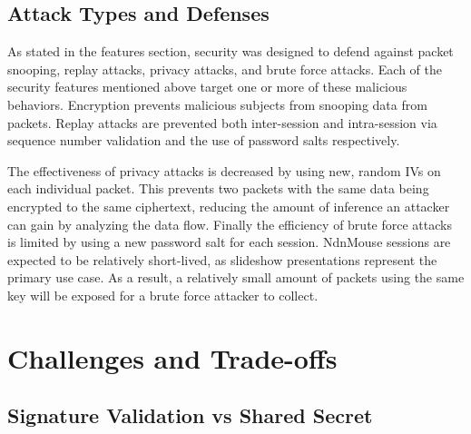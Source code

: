 \documentclass{sig-alternate}
\renewcommand\_{\textunderscore\allowbreak}  %
\begin{document}
\subsection{Attack Types and Defenses}
As stated in the features section, security was designed to defend against packet snooping, replay attacks, privacy attacks, and brute force attacks. Each of the security features mentioned above target one or more of these malicious behaviors. Encryption prevents malicious subjects from snooping data from packets. Replay attacks are prevented both inter-session and intra-session via sequence number validation and the use of password salts respectively. 

The effectiveness of privacy attacks is decreased by using new, random IVs on each individual packet. This prevents two packets with the same data being encrypted to the same ciphertext, reducing the amount of inference an attacker can gain by analyzing the data flow. Finally the efficiency of brute force attacks is limited by using a new password salt for each session. NdnMouse sessions are expected to be relatively short-lived, as slideshow presentations represent the primary use case. As a result, a relatively small amount of packets using the same key will be exposed for a brute force attacker to collect.
	
\section{Challenges and Trade-offs}

\subsection{Signature Validation vs Shared Secret}
\end{document}
